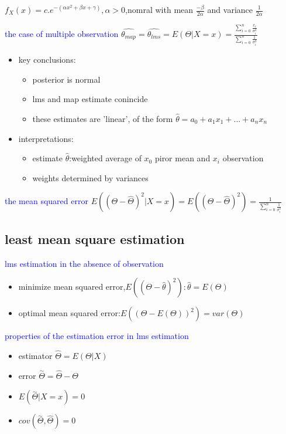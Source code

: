 $f_X(x)=c.e^{-(\alpha x^2+\beta x+\gamma)},\alpha>0$,nomral with mean $\frac{-\beta}{2\alpha}$ and variance $\frac{1}{2\alpha}$

\textcolor{blue}{the case of multiple observation}
$\hat{\theta_{map}}=\hat{\theta_{lms}}=E(\Theta|X=x)=\frac{\sum_{i=0}^{n}\frac{x_i}{\sigma_i^2}}{\sum_{i=0}^{n}\frac{1}{\sigma_i^2}}$

\begin{itemize}
    \item key conclusions:
    \begin{itemize}
        \item posterior is normal
        \item lms and map estimate conincide
        \item these estimates are 'linear', of the form $\hat{\theta}=a_0+a_1x_1+...+a_nx_n$ 
    \end{itemize}
    \item interpretations:
    \begin{itemize}
        \item estimate $\hat{\theta}$:weighted average of $x_0$ piror mean and $x_i$ observation
        \item weights determined by variances
    \end{itemize}
\end{itemize}

\textcolor{blue}{the mean squared error}
$E((\Theta-\hat{\Theta})^2|X=x)=E((\Theta-\hat{\Theta})^2)=\frac{1}{\sum_{i=0}^{n}\frac{1}{\sigma_i^2}}$






\subsection*{least mean square estimation}


\textcolor{blue}{lms estimation in the absence of observation}

\begin{itemize}
    \item minimize mean squared error,$E((\Theta-\hat{\theta})^2):\hat{\theta}=E(\Theta)$
    \item optimal mean squared error:$E((\Theta-E(\Theta))^2)=var(\Theta)$
\end{itemize}


\textcolor{blue}{properties of the estimation error in lms estimation}

\begin{itemize}
    \item estimator $\hat{\Theta}=E(\Theta|X)$
    \item error $\overset{\sim}{\Theta}=\hat{\Theta}-\Theta$
    \item $E(\overset{\sim}{\Theta}|X=x)=0$
    \item $cov(\overset{\sim}{\Theta},\hat{\Theta})=0$
\end{itemize}